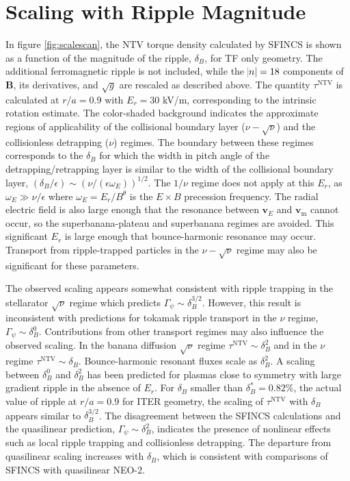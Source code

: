 \documentclass[aip, pop, preprint]{revtex4-1}
\numberwithin{figure}{section}
\numberwithin{equation}{section}
\begin{document}
\FloatBarrier

\section{Scaling with Ripple Magnitude}\label{scaling}
In figure \ref{fig:scalescan}, the NTV torque density calculated by SFINCS is shown as a function of the magnitude of the ripple, $\delta_B$, for TF only geometry. The additional ferromagnetic ripple is not included, while the $\abs{n}=18$ components of $\bm{B}$, its derivatives, and $\sqrt{g}$ are rescaled as described above. The quantity $\tau^{\mathrm{NTV}}$ is calculated at $r/a = 0.9$ with $E_r = 30$ kV/m, corresponding to the intrinsic rotation estimate. The color-shaded background indicates the approximate regions of applicability of the collisional boundary layer ($\nu-\sqrt{\nu}$) and the collisionless detrapping ($\nu$) regimes. The boundary between these regimes corresponds to the $\delta_B$ for which the width in pitch angle of the detrapping/retrapping layer is similar to the width of the collisional boundary layer, $(\delta_B/\epsilon) \sim (\nu/(\epsilon \omega_E))^{1/2}$. The $1/\nu$ regime \cite{Shaing2003} does not apply at this $E_r$, as $\omega_E \gg \nu/\epsilon$ where $\omega_E = E_r/B^{\theta}$ is the $E\times B$ precession frequency. The radial electric field is also large enough that the resonance between $\bm{v}_{E}$ and $\bm{v}_{\mathrm{m}}$ cannot occur, so the superbanana-plateau \cite{Shaing2009_sbp} and superbanana \cite{Shaing2009_sb} regimes are avoided. This significant $E_r$ is large enough that bounce-harmonic resonance may occur.\cite{Park2009} Transport from ripple-trapped particles in the $\nu- \sqrt{\nu}$ regime may also be significant for these parameters.

The observed scaling appears somewhat consistent with ripple trapping in the stellarator $\sqrt{\nu}$ regime \cite{Ho1987} which predicts $\Gamma_{\psi} \sim \delta_B^{3/2}$. However, this result is inconsistent with predictions for tokamak ripple transport in the $\nu$ regime, $\Gamma_{\psi} \sim \delta_B^0$.\cite{Tsang1977,Linsker1982} Contributions from other transport regimes may also influence the observed scaling. In the banana diffusion $\sqrt{\nu}$ regime $\tau^{\mathrm{NTV}} \sim \delta_B^2$ and in the $\nu$ regime $\tau^{\mathrm{NTV}} \sim \delta_B$. Bounce-harmonic resonant fluxes scale as $\delta_B^2$.\cite{Park2009} A scaling between $\delta_B^0$ and $\delta_B^{2}$ has been predicted for plasmas close to symmetry with large gradient ripple in the absence of $E_r$.\cite{Calvo2014} For $\delta_B$ smaller than $\delta_B^* = 0.82\%$, the actual value of ripple at $r/a=0.9$ for ITER geometry, the scaling of $\tau^{\mathrm{NTV}}$ with $\delta_B$ appears similar to $\delta_B^{3/2}$. The disagreement between the SFINCS calculations and the quasilinear prediction, $\Gamma_{\psi} \sim \delta_B^2$, indicates the presence of nonlinear effects such as local ripple trapping and collisionless detrapping. The departure from quasilinear scaling increases with $\delta_B$, which is consistent with comparisons of SFINCS with quasilinear NEO-2.\cite{Martitsch2016} 
\end{document}
